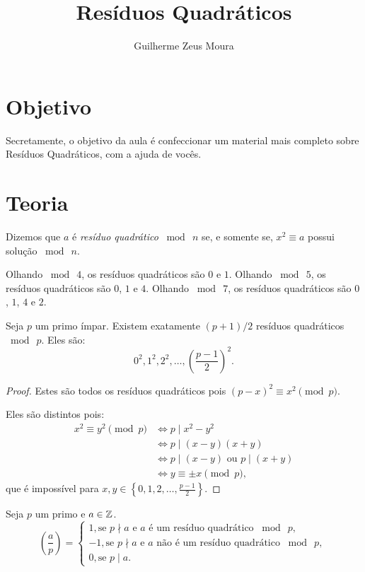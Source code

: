 \documentclass[10pt,a4paper]{article}
\title{Resíduos Quadráticos}
\author{Guilherme Zeus Moura}
\newcommand{\leg}[2]{\left(\frac{#1}{#2}\right)}
\newcommand{\tmod}[1]{\bmod{\ #1}}
\begin{document}
	
	\zeustitle

	\setcounter{section}{-1}
	\section{Objetivo}
	Secretamente, o objetivo da aula é confeccionar um material mais completo sobre Resíduos Quadráticos, com a ajuda de vocês.

	\section{Teoria}
	\begin{defn}
		Dizemos que $a$ é \textit{resíduo quadrático} $\tmod{n}$ se, e somente se, $x^2 \equiv a$ possui solução $\tmod{n}$.
	\end{defn}
	\begin{exmp}
		Olhando $\tmod{4}$, os resíduos quadráticos são $0$ e $1$. Olhando $\tmod{5}$, os resíduos quadráticos são $0$, $1$ e $4$. Olhando $\tmod{7}$, os resíduos quadráticos são $0$, $1$, $4$ e $2$.
	\end{exmp}
	\begin{prop}
		Seja $p$ um primo ímpar. Existem exatamente $(p+1)/2$ resíduos quadráticos $\tmod{p}$. Eles são:
		$$ 0^2,  1^2, 2^2, \dots, \left( \frac{p-1}{2} \right)^2.$$
	\end{prop}
	\begin{proof}
		Estes são todos os resíduos quadráticos pois $(p-x)^2 \equiv x^2 \pmod{p}$.

		Eles são distintos pois:
		\begin{align*}
			x^2 \equiv y^2 \pmod{p} & \iff p \mid x^2 - y^2\\
			                        & \iff p \mid (x - y)(x + y)\\
				           	 	    & \iff p \mid (x-y) \text{ ou } p \mid (x+y)\\
						            & \iff y \equiv \pm x \pmod{p},
		\end{align*}
		que é impossível para $x, y \in \left\{ 0, 1, 2, \dots, \frac{p-1}{2} \right\}$.
	\end{proof}
	\begin{defn}
		Seja $p$ um primo e $a \in \mathbb{Z}$.
		$$\leg{a}{p} =
		\begin{cases}
			1,  \text{se $p \nmid a$ e $a$ é um resíduo quadrático $\tmod{p}$, }\\
			-1, \text{se $p \nmid a$  e $a$ não é um resíduo quadrático $\tmod{p}$, }\\
			0,  \text{se $p \mid a$.}
		\end{cases}$$
	\end{defn}
\end{document}
